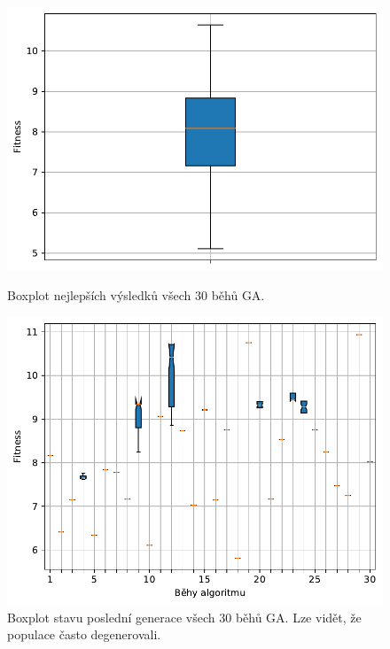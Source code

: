 \begin{figure}[H]
\begin{minipage}[t]{0.475\linewidth}
\includegraphics[width=\linewidth]{obrazky-figures/statistics/Benchmarks/Ackley/GA/bestsBoxplot_WithOutliers.pdf}
\caption{Boxplot nejlepších výsledků všech $30$ běhů GA.}
\label{fg:bench:ackley:ga:best}
\end{minipage}
\hfill
\begin{minipage}[t]{0.475\linewidth}
\includegraphics[width=\linewidth]{obrazky-figures/statistics/Benchmarks/Ackley/GA/lastGenBoxplots.pdf}
\caption{Boxplot stavu poslední generace všech $30$ běhů GA. Lze vidět, že populace často degenerovali.}
\label{fg:bench:ackley:ga:lastGen}
\end{minipage}
\end{figure}


